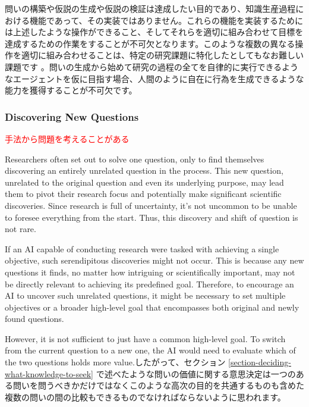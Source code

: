 問いの構築や仮説の生成や仮説の検証は達成したい目的であり、知識生産過程における機能であって、その実装ではありません。これらの機能を実装するためには上述したような操作ができること、そしてそれらを適切に組み合わせて目標を達成するための作業をすることが不可欠となります。このような複数の異なる操作を適切に組み合わせることは、特定の研究課題に特化したとしてもなお難しい課題です \cite{coley2020autonomousII}。問いの生成から始めて研究の過程の全てを自律的に実行できるようなエージェントを仮に目指す場合、人間のように自在に行為を生成できるような能力を獲得することが不可欠です。

\subsubsection{Discovering New Questions}
\textcolor{red}{手法から問題を考えることがある}

Researchers often set out to solve one question, only to find themselves discovering an entirely unrelated question in the process. This new question, unrelated to the original question and even its underlying purpose, may lead them to pivot their research focus and potentially make significant scientific discoveries. Since research is full of uncertainty, it's not uncommon to be unable to foresee everything from the start. Thus, this discovery and shift of question is not rare.

If an AI capable of conducting research were tasked with achieving a single objective, such serendipitous discoveries might not occur. This is because any new questions it finds, no matter how intriguing or scientifically important, may not be directly relevant to achieving its predefined goal. Therefore, to encourage an AI to uncover such unrelated questions, it might be necessary to set multiple objectives or a broader high-level goal that encompasses both original and newly found questions. 

However, it is not sufficient to just have a common high-level goal.
To switch from the current question to a new one, the AI would need to evaluate which of the two questions holds more value.したがって、セクション \ref{section-deciding-what-knowledge-to-seek} で述べたような問いの価値に関する意思決定は一つのある問いを問うべきかだけではなくこのような高次の目的を共通するものも含めた複数の問いの間の比較もできるものでなければならないように思われます。


